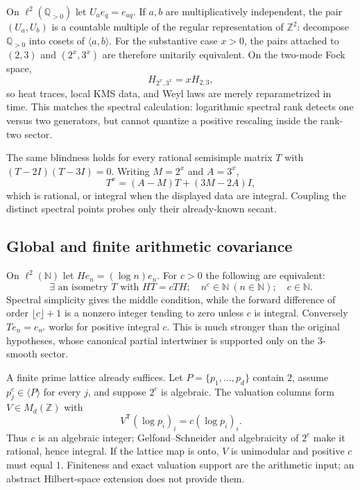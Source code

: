 \documentclass[11pt,oneside]{article}
\theoremstyle{definition}
\theoremstyle{remark}
\newcommand{\N}{\mathbb N}
\newcommand{\Z}{\mathbb Z}
\newcommand{\Q}{\mathbb Q}
\begin{document}
On $\ell^2(\Q_{>0})$ let $U_a e_q=e_{aq}$.  If $a,b$ are multiplicatively independent,
the pair $(U_a,U_b)$ is a countable multiple of the regular representation of $\Z^2$:
decompose $\Q_{>0}$ into cosets of $\langle a,b\rangle$.  For the substantive case $x>0$,
the pairs attached to $(2,3)$ and $(2^x,3^x)$ are therefore unitarily equivalent.  On the
two-mode Fock space,
\begin{equation}
 H_{2^x,3^x}=xH_{2,3},
\end{equation}
so heat traces, local KMS data, and Weyl laws are merely reparametrized in time.  This matches
the spectral calculation: logarithmic spectral rank detects one versus two generators, but
cannot quantize a positive rescaling inside the rank-two sector.

The same blindness holds for every rational semisimple matrix $T$ with
$(T-2I)(T-3I)=0$.  Writing $M=2^x$ and $A=3^x$,
\begin{equation}
 T^x=(A-M)T+(3M-2A)I,
 \label{opcoh:eq-semisimple}
\end{equation}
which is rational, or integral when the displayed data are integral.  Coupling the distinct
spectral points probes only their already-known secant.

\subsection{Global and finite arithmetic covariance}
\label{opcoh:arithmetic-covariance}

On $\ell^2(\N)$ let $He_n=(\log n)e_n$.  For $c>0$ the following are equivalent:
\begin{equation}
 \exists\text{ an isometry }T\text{ with }HT=cTH;
 \quad n^c\in\N\ (n\in\N);
 \quad c\in\N.
 \label{opcoh:eq-global-covariance}
\end{equation}
Spectral simplicity gives the middle condition, while the forward difference of order
$\lfloor c\rfloor+1$ is a nonzero integer tending to zero unless $c$ is integral.  Conversely
$T e_n=e_{n^c}$ works for positive integral $c$.  This is much stronger than the original
hypotheses, whose canonical partial intertwiner is supported only on the $3$-smooth sector.

A finite prime lattice already suffices.  Let $P=\{p_1,\ldots,p_d\}$ contain $2$, assume
$p_j^c\in\langle P\rangle$ for every $j$, and suppose $2^c$ is algebraic.  The valuation
columns form $V\in M_d(\Z)$ with
\begin{equation}
 V^{\mathsf T}(\log p_i)_i=c(\log p_i)_i.
\end{equation}
Thus $c$ is an algebraic integer; Gelfond--Schneider and algebraicity of $2^c$ make it
rational, hence integral.  If the lattice map is onto, $V$ is unimodular and positive $c$
must equal $1$.  Finiteness and exact valuation support are the arithmetic input; an abstract
Hilbert-space extension does not provide them.
\end{document}
